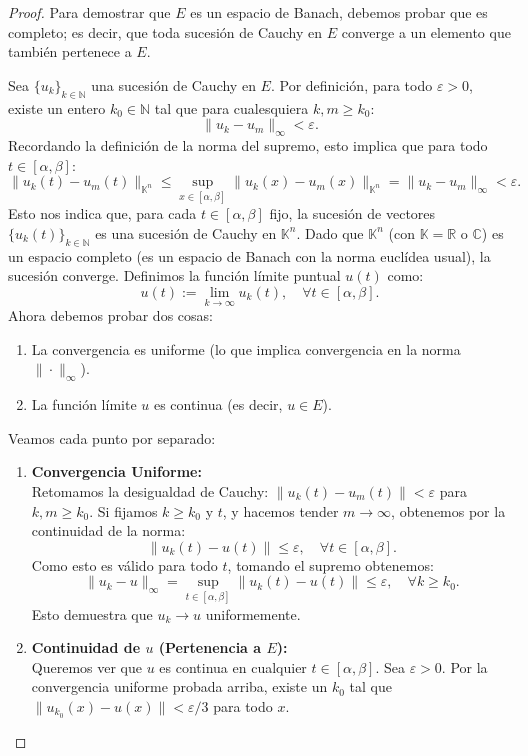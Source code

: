 \begin{proof}
    Para demostrar que $E$ es un espacio de Banach, debemos probar que es completo; es decir, que toda sucesión de Cauchy en $E$ converge a un elemento que también pertenece a $E$.

    Sea $\{ u_k \}_{k \in \mathbb{N}}$ una sucesión de Cauchy en $E$. Por definición, para todo $\varepsilon > 0$, existe un entero $k_0 \in \mathbb{N}$ tal que para cualesquiera $k, m \geq k_0$:
    \[
        \| u_k - u_m \|_{\infty} < \varepsilon.
    \]
    Recordando la definición de la norma del supremo, esto implica que para todo $t \in [\alpha, \beta]$:
    \[
        \| u_k(t) - u_m(t) \|_{\mathbb{K}^n} \leq \sup_{x \in [\alpha, \beta]} \| u_k(x) - u_m(x) \|_{\mathbb{K}^n} = \| u_k - u_m \|_{\infty} < \varepsilon.
    \]
    Esto nos indica que, para cada $t \in [\alpha, \beta]$ fijo, la sucesión de vectores $\{ u_k(t) \}_{k \in \mathbb{N}}$ es una sucesión de Cauchy en $\mathbb{K}^n$. Dado que $\mathbb{K}^n$ (con $\mathbb{K} = \mathbb{R}$ o $\mathbb{C}$) es un espacio completo (es un espacio de Banach con la norma euclídea usual), la sucesión converge. Definimos la función límite puntual $u(t)$ como:
    \[
        u(t) := \lim_{k \to \infty} u_k(t), \quad \forall t \in [\alpha, \beta].
    \]
    Ahora debemos probar dos cosas:
    \begin{enumerate}
        \item La convergencia es uniforme (lo que implica convergencia en la norma $\| \cdot \|_\infty$).
        \item La función límite $u$ es continua (es decir, $u \in E$).
    \end{enumerate}

    Veamos cada punto por separado:

    \begin{enumerate}
        \item \textbf{Convergencia Uniforme:}\\
        Retomamos la desigualdad de Cauchy: $\| u_k(t) - u_m(t) \| < \varepsilon$ para $k, m \geq k_0$. Si fijamos $k \geq k_0$ y $t$, y hacemos tender $m \to \infty$, obtenemos por la continuidad de la norma:
        \[
            \| u_k(t) - u(t) \| \leq \varepsilon, \quad \forall t \in [\alpha, \beta].
        \]
        Como esto es válido para todo $t$, tomando el supremo obtenemos:
        \[
            \| u_k - u \|_{\infty} = \sup_{t \in [\alpha, \beta]} \| u_k(t) - u(t) \| \leq \varepsilon, \quad \forall k \geq k_0.
        \]
        Esto demuestra que $u_k \to u$ uniformemente.
        \item \textbf{Continuidad de $u$ (Pertenencia a $E$):}\\
        Queremos ver que $u$ es continua en cualquier $t \in [\alpha, \beta]$. Sea $\varepsilon > 0$. Por la convergencia uniforme probada arriba, existe un $k_0$ tal que $\| u_{k_0}(x) - u(x) \| < \varepsilon/3$ para todo $x$.
        

\end{enumerate}
\end{proof}
